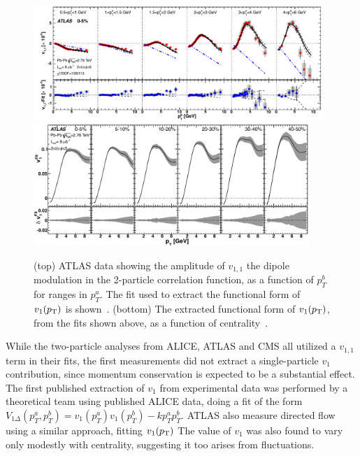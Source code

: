 \begin{figure}[!tb]
\begin{center}
\includegraphics[width=0.98\textwidth]{flowcorrelations_figs/atlas_vn_fig_20a.pdf}
\includegraphics[width=0.93\textwidth]{flowcorrelations_figs/atlas_vn_fig_21.pdf}
\caption[]{ (top) ATLAS data showing the amplitude of $v_{1,1}$ the
  dipole modulation in the 2-particle correlation function, as a
  function of $p^b_T$ for ranges in $p^a_T$.  The fit used to extract
  the functional form of $v_1(\mbox{$p_{\mathrm{T}}$})$ is shown~\cite{ATLAS:2012at}.
  (bottom) The extracted functional form of $v_1(\mbox{$p_{\mathrm{T}}$})$, from the fits
  shown above, as a function of centrality~\cite{ATLAS:2012at}.  }
\label{fig:pas:fc:v1}
\end{center}
\end{figure}

While the two-particle analyses from ALICE, ATLAS and CMS all utilized a $v_{1,1}$ term in their fits, the first measurements
did not extract a single-particle $v_1$ contribution, since momentum conservation is expected to be a substantial effect.
The first published extraction of $v_1$ from experimental data was performed by a theoretical team using published ALICE data,
doing a fit of the form $V_{1\Delta}(p^a_T,p^b_T) = v_1(p^a_T)v_1(p^b_T) - k p^a_T p^b_T$.
ATLAS also measure directed flow using a similar approach,
fitting $v_1(\mbox{$p_{\mathrm{T}}$})$
The value of $v_1$ was also found to vary only modestly with centrality, suggesting it too arises from fluctuations.


